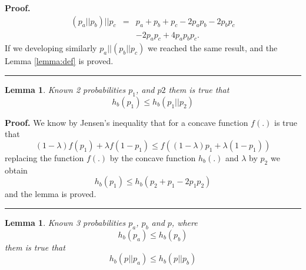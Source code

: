 \documentclass[a4paper,10pt]{article}
\newtheorem{mylemma}[mytheorem]{Lemma}
\newenvironment{myproof}[1][Proof]{\textbf{#1.} }{\ \rule{0.5em}{0.5em}}
\begin{document}
\begin{myproof}
\label{proof:def}
\begin{equation} \label{eq:def2}
\begin{matrix}
(p_a || p_b)||p_c & = & p_a + p_b + p_c -2 p_a p_b -2 p_b p_c  \\
~                 & ~ & -2 p_a p_c + 4 p_a p_b p_c.
\end{matrix}
\end{equation} 
If we developing similarly $p_a || (p_b||p_c)$ we reached the same result, and 
the Lemma \ref{lemma:def} is proved.
\end{myproof}
\begin{mdframed}[style=MDFStyGrayScreen]
\begin{mylemma}
\label{lemma:psimple} 
Known 2 probabilities $p_1$, and $p2$
them is true that
\begin{equation} \label{eq:psimple1}
h_b(p_1) \leq h_b(p_1||p_2) 
\end{equation}
\end{mylemma}
\end{mdframed}
\begin{myproof}
\label{proof:psimple} 
We know  by Jensen's inequality \cite{cover} that for a concave function $f(.)$ 
is true that
\begin{equation} \label{eq:psimple2}
(1-\lambda) f(p_1) +\lambda f(1-p_1)  \leq f((1-\lambda) p_1 +\lambda (1-p_1))
\end{equation}
replacing the function $f(.)$ by the concave function $h_b(.)$ and $\lambda$ 
by $p_2$ we obtain
\begin{equation} \label{eq:psimple3}
h_b(p_1)  \leq h_b(p_2 + p_1 - 2 p_1 p_2)
\end{equation}
and the lemma is proved.
\end{myproof}
\begin{mdframed}[style=MDFStyGrayScreen]
\begin{mylemma}
\label{lemma:ppapb} 
Known 3 probabilities $p_a$, $p_b$ and $p$, where
\begin{equation} \label{eq:ppapb0}
h_b(p_a) \leq h_b(p_b) 
\end{equation}
them is true that
\begin{equation} \label{eq:ppapb1}
h_b(p||p_a) \leq h_b(p||p_b) 
\end{equation}
\end{mylemma}
\end{mdframed}
\end{document}

